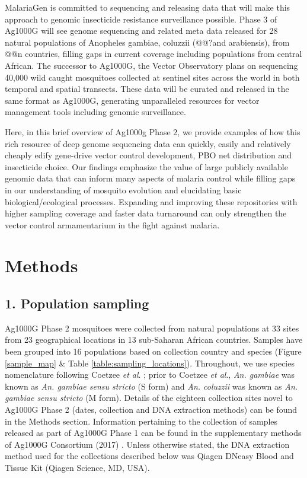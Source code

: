 \documentclass[a4paper,11pt,abstracton,hidelinks]{scrartcl}
\begin{document}
MalariaGen is committed to sequencing and releasing data that will make this approach to genomic insecticide resistance surveillance possible. 
%
Phase 3 of Ag1000G will see genome sequencing and related meta data released for 28 natural populations of Anopheles gambiae, coluzzii (@@?and arabiensis), from @@n countries, filling gaps in current coverage including populations from central African.
%
The successor to Ag1000G, the Vector Observatory plans on sequencing 40,000 wild caught mosquitoes collected at sentinel sites across the world in both temporal and spatial transects.
%
These data will be curated and released in the same format as Ag1000G, generating unparalleled resources for vector management tools including genomic surveillance. 


Here, in this brief overview of Ag1000g Phase 2, we provide examples of how this rich resource of deep genome sequencing data can quickly, easily and relatively cheaply edify gene-drive vector control development, PBO net distribution and insecticide choice.
%
Our findings emphasize the value of large publicly available genomic data that can inform many aspects of malaria control while filling gaps in our understanding of mosquito evolution and elucidating basic biological/ecological processes.
%
Expanding and improving these repositories with higher sampling coverage and faster data turnaround can only strengthen the vector control armamentarium in the fight against malaria.

\section*{Methods}


\subsection*{1. Population sampling}

%
Ag1000G Phase 2 mosquitoes were collected from natural populations at 33 sites from 23
geographical locations in 13 sub-Saharan African countries. 
%
Samples have been grouped into 16 populations based on collection country and species (Figure \ref{sample_map} \& Table \ref{table:sampling_locations}).
%
Throughout, we use species nomenclature following Coetzee \textit{et al}. \cite{Coetzee2013};	
%
prior to	 Coetzee	 \textit{et al}., \textit{An. gambiae} was known as \textit{An. gambiae sensu stricto} (S form) and \textit{An. coluzzii} was known as \textit{An. gambiae sensu stricto} (M form).
%
Details of the eighteen collection sites novel to Ag1000G Phase 2 (dates, collection and DNA extraction methods) can be found in the Methods section.
%
Information pertaining to the collection of samples released as part of Ag1000G Phase 1 can be found in the supplementary methods of Ag1000G Consortium (2017) \cite{Ag1000gConsortium2017}.
%
Unless otherwise stated, the DNA extraction method used for the collections described below was Qiagen DNeasy Blood and Tissue Kit (Qiagen Science, MD, USA).
\end{document}
